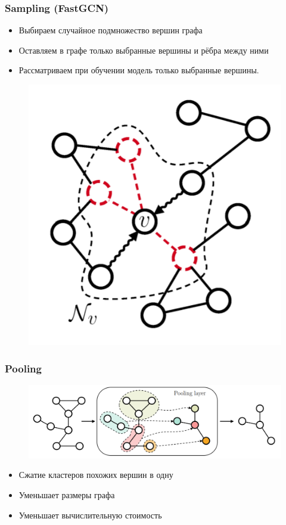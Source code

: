 \documentclass{beamer}
\begin{document}
\begin{frame}
\frametitle{Sampling (FastGCN)}
\begin{multicols}{2}
\begin{itemize}
	\item Выбираем случайное подмножество вершин графа
	\item Оставляем в графе только выбранные вершины и рёбра между ними 
	\item Рассматриваем при обучении модель только выбранные вершины.
\end{itemize}
	
\columnbreak
	\begin{figure}
		\includegraphics[width=\columnwidth]{sampling.png}
	\end{figure}
\end{multicols}
\end{frame}

\begin{frame}
\frametitle{Pooling}
\begin{figure}
	\includegraphics[width=\columnwidth]{pooling.png}
\end{figure}
\begin{itemize}
	\item Сжатие кластеров похожих вершин в одну
	\item Уменьшает размеры графа
	\item Уменьшает вычислительную стоимость
\end{itemize}
\end{frame}
\end{document}
